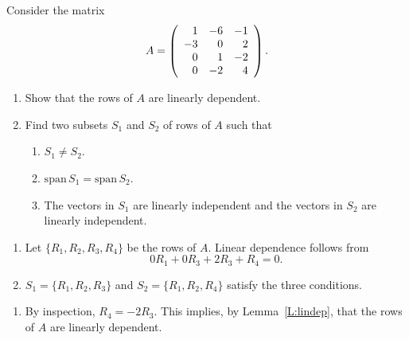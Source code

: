 \documentclass{ximera}
\author{Matthew Carr \& Marty Golubitsky}
\begin{document}
\begin{exercise}\label{mc.exerciseErr6_M}
Consider the matrix
 \[
A=\left(\begin{array}{rrrrrrrrrrrrrrrrrr} 1 & -6 & -1 \\ -3 & 0 & 2 \\ 0 & 1 & -2 \\ 0 & -2 & 4 \end{array}\right)\ldotp
\]
\begin{enumerate} 
\item Show that the rows of $A$ are  linearly dependent.
\item Find two subsets $S_1$ and $S_2$ of rows of $A$ such that 
\begin{enumerate}
	\item $S_1\ne S_2$.
	\item $\mathrm{span}\,S_1=\mathrm{span}\,S_2$. 
	\item The vectors in $S_1$ are linearly independent and the vectors in $S_2$ are linearly independent. 
	\end{enumerate}
\end{enumerate}

\begin{solution}
\ans 
\begin{enumerate}
\item Let $\{R_1,R_2,R_3,R_4\}$ be the rows of $A$.  Linear dependence follows from 
\[
0R_1 + 0R_3+2R_3+R_4 = 0.
\] 
\item $S_1=\{R_1,R_2,R_3\}$ and $S_2=\{R_1,R_2,R_4\}$ satisfy the three conditions.
\end{enumerate}

\soln 

\begin{enumerate}

\item By inspection, $R_4=-2R_3$. This implies, by Lemma~\ref{L:lindep}, that the rows of $A$ are linearly dependent. 


\end{enumerate}
\end{solution}
\end{exercise}
\end{document}
